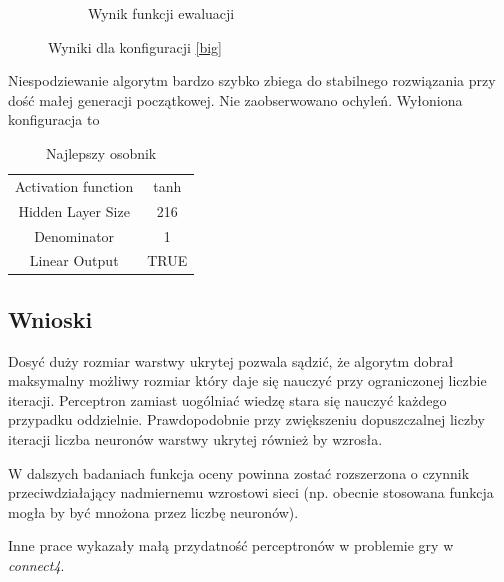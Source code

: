 \documentclass{llncs}
\begin{document}
\begin{figure}[H]
\begin{subfigure}[b]{0.5\textwidth}
                \caption{Wynik funkcji ewaluacji}
                \label{fig:tiger}
        \end{subfigure}
        \caption{Wyniki dla konfiguracji \ref{big}}
        \label{fig:small}
\end{figure}

Niespodziewanie algorytm bardzo szybko zbiega do stabilnego rozwiązania przy dość małej
generacji początkowej. Nie zaobserwowano ochyleń. Wyłoniona konfiguracja to 
\begin{table}[H]
\caption{Najlepszy osobnik}
\label{the_choosen_one}
\centering
\begin{tabular}{|c|c|}
  Activation function                  & tanh \\
  Hidden Layer Size       & 216 \\ 
  Denominator & 1 \\
  Linear Output               & TRUE \\
\end{tabular} 
\end{table}

\subsection{Wnioski}
Dosyć duży rozmiar warstwy ukrytej pozwala sądzić, że algorytm dobrał
maksymalny możliwy rozmiar który daje się nauczyć przy ograniczonej liczbie 
iteracji. Perceptron zamiast uogólniać wiedzę stara się nauczyć każdego przypadku
oddzielnie. Prawdopodobnie przy zwiększeniu dopuszczalnej liczby iteracji
liczba neuronów warstwy ukrytej również by wzrosła.

W dalszych badaniach funkcja oceny powinna zostać rozszerzona o czynnik
przeciwdziałający nadmiernemu wzrostowi sieci (np. obecnie stosowana funkcja
mogła by być mnożona przez liczbę neuronów).

Inne prace wykazały małą przydatność perceptronów w problemie gry w \emph{connect4}.
\end{document}
